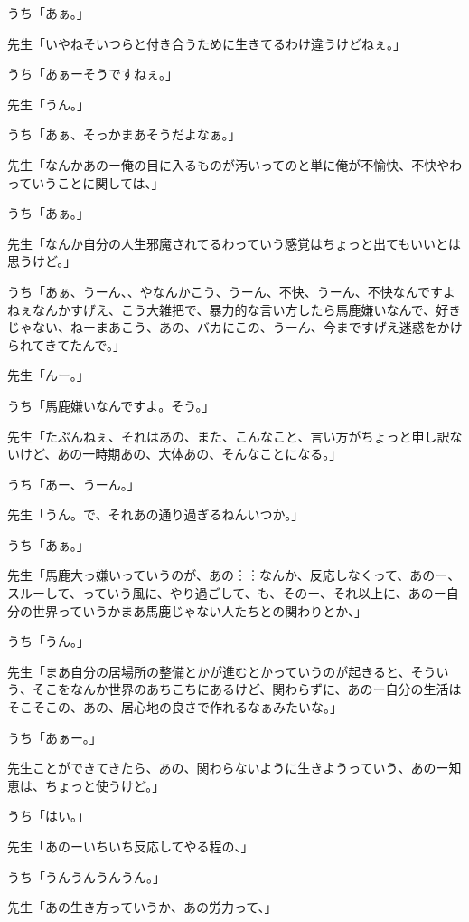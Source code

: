 \documentclass[b5j,twoside,twocolumn]{utarticle}
\begin{document}
\begin{description}
\item うち「あぁ。」
\item 先生「いやねそいつらと付き合うために生きてるわけ違うけどねぇ。」
\item うち「あぁーそうですねぇ。」
\item 先生「うん。」
\item うち「あぁ、そっかまあそうだよなぁ。」
\item 先生「なんかあのー俺の目に入るものが汚いってのと単に俺が不愉快、不快やわっていうことに関しては、」
\item うち「あぁ。」
\item 先生「なんか自分の人生邪魔されてるわっていう感覚はちょっと出てもいいとは思うけど。」
\item うち「あぁ、うーん、、やなんかこう、うーん、不快、うーん、不快なんですよねぇなんかすげえ、こう大雑把で、暴力的な言い方したら馬鹿嫌いなんで、好きじゃない、ねーまあこう、あの、バカにこの、うーん、今まですげえ迷惑をかけられてきてたんで。」
\item 先生「んー。」
\item うち「馬鹿嫌いなんですよ。そう。」
\item 先生「たぶんねぇ、それはあの、また、こんなこと、言い方がちょっと申し訳ないけど、あの一時期あの、大体あの、そんなことになる。」
\item うち「あー、うーん。」
\item 先生「うん。で、それあの通り過ぎるねんいつか。」
\item うち「あぁ。」
\item 先生「馬鹿大っ嫌いっていうのが、あの︙︙なんか、反応しなくって、あのー、スルーして、っていう風に、やり過ごして、も、そのー、それ以上に、あのー自分の世界っていうかまあ馬鹿じゃない人たちとの関わりとか、」
\item うち「うん。」
\item 先生「まあ自分の居場所の整備とかが進むとかっていうのが起きると、そういう、そこをなんか世界のあちこちにあるけど、関わらずに、あのー自分の生活はそこそこの、あの、居心地の良さで作れるなぁみたいな。」
\item うち「あぁー。」
\item 先生ことができてきたら、あの、関わらないように生きようっていう、あのー知恵は、ちょっと使うけど。」
\item うち「はい。」
\item 先生「あのーいちいち反応してやる程の、」
\item うち「うんうんうんうん。」
\item 先生「あの生き方っていうか、あの労力って、」

\end{description}
\end{document}
